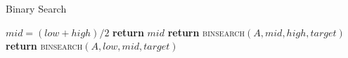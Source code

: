\documentclass{article}
\begin{document}
\begin{algorithm}
  \caption{Binary Search}
  \begin{algorithmic}
    \State $mid = (low + high)/2$
      \State \textbf{return} $mid$
      \State \textbf{return} \textsc{binsearch}$(A, mid, high, target)$
    \Else
      \State \textbf{return} \textsc{binsearch}$(A, low, mid, target)$
    \EndIf
    \EndFunction
  \end{algorithmic}
\end{algorithm}
\end{document}
